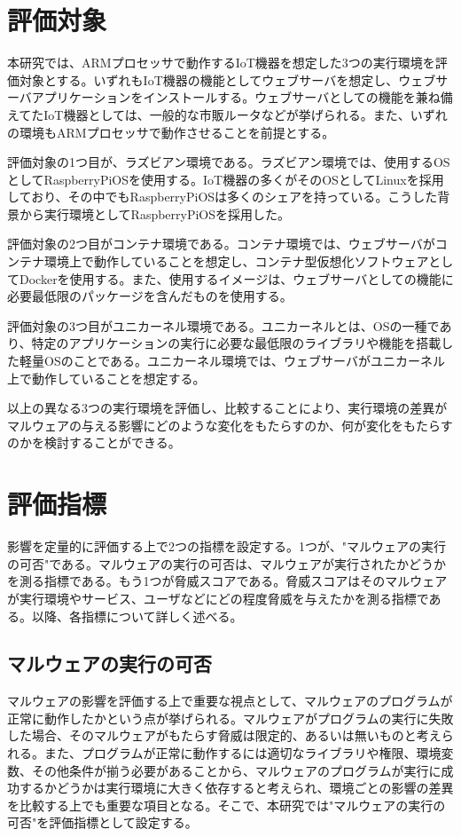 \documentclass[12pt,a4paper,titlepage,report]{jsbook}
\begin{document}
\section{評価対象}
本研究では、ARMプロセッサで動作するIoT機器を想定した3つの実行環境を評価対象とする。いずれもIoT機器の機能としてウェブサーバを想定し、ウェブサーバアプリケーションをインストールする。ウェブサーバとしての機能を兼ね備えてたIoT機器としては、一般的な市販ルータなどが挙げられる。また、いずれの環境もARMプロセッサで動作させることを前提とする。

評価対象の1つ目が、ラズビアン環境である。ラズビアン環境では、使用するOSとしてRaspberryPiOSを使用する。IoT機器の多くがそのOSとしてLinuxを採用しており、その中でもRaspberryPiOSは多くのシェアを持っている\cite{malwaresurvey}。こうした背景から実行環境としてRaspberryPiOSを採用した。

評価対象の2つ目がコンテナ環境である。コンテナ環境では、ウェブサーバがコンテナ環境上で動作していることを想定し、コンテナ型仮想化ソフトウェアとしてDockerを使用する。また、使用するイメージは、ウェブサーバとしての機能に必要最低限のパッケージを含んだものを使用する。

評価対象の3つ目がユニカーネル環境である。ユニカーネルとは、OSの一種であり、特定のアプリケーションの実行に必要な最低限のライブラリや機能を搭載した軽量OSのことである。ユニカーネル環境では、ウェブサーバがユニカーネル上で動作していることを想定する。

以上の異なる3つの実行環境を評価し、比較することにより、実行環境の差異がマルウェアの与える影響にどのような変化をもたらすのか、何が変化をもたらすのかを検討することができる。

\section{評価指標}
影響を定量的に評価する上で2つの指標を設定する。1つが、"マルウェアの実行の可否"である。マルウェアの実行の可否は、マルウェアが実行されたかどうかを測る指標である。もう1つが脅威スコアである。脅威スコアはそのマルウェアが実行環境やサービス、ユーザなどにどの程度脅威を与えたかを測る指標である。以降、各指標について詳しく述べる。

\subsection{マルウェアの実行の可否}
マルウェアの影響を評価する上で重要な視点として、マルウェアのプログラムが正常に動作したかという点が挙げられる。マルウェアがプログラムの実行に失敗した場合、そのマルウェアがもたらす脅威は限定的、あるいは無いものと考えられる。また、プログラムが正常に動作するには適切なライブラリや権限、環境変数、その他条件が揃う必要があることから、マルウェアのプログラムが実行に成功するかどうかは実行環境に大きく依存すると考えられ、環境ごとの影響の差異を比較する上でも重要な項目となる。そこで、本研究では"マルウェアの実行の可否"を評価指標として設定する。
\end{document}

